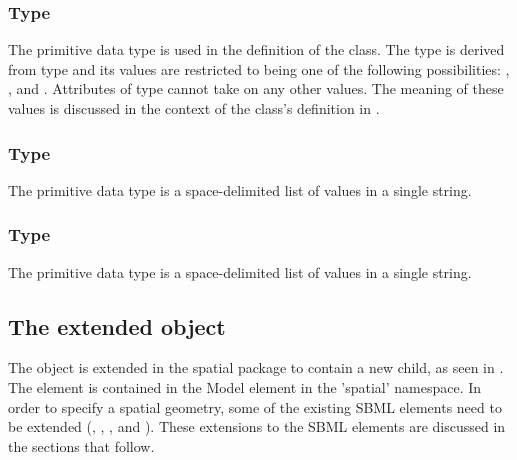 \subsubsection{Type \fixttspace{}}
\label{primtype-setoperation}

The  primitive data type is used in the definition of the \CSGSetOperator class.  The type  is derived from type  and its values are restricted to being one of the following possibilities: , , and .  Attributes of type  cannot take on any other values.  The meaning of these values is discussed in the context of the \CSGSetOperator class's definition in .


\subsubsection{Type \fixttspace{}}
\label{primtype-doublearray}

The  primitive data type is a space-delimited list of  values in a single string.  


\subsubsection{Type \fixttspace{}}
\label{primtype-integerarray}

The  primitive data type is a space-delimited list of  values in a single string.  

\clearpage


\subsection{The extended \Model object}
\label{extended-model-class}
The \Model object is extended in the spatial package to contain a new \Geometry child, as seen in
. The \Geometry element is contained in the Model element in the 'spatial' namespace. In order to specify a spatial geometry, some of the existing SBML elements need to be extended (\Compartment, \Species, \Parameter, and \Reaction). These extensions to the SBML elements are discussed in the sections that follow.
 
